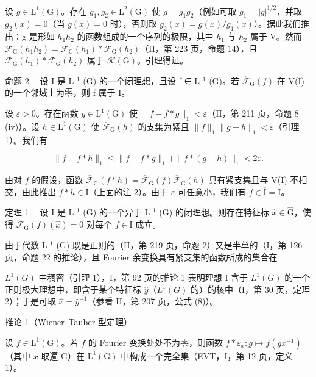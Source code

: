 设 \(g \in \mathrm{L}^{1}(\mathrm{G})\)。存在 \(g_{1}, g_{2} \in \mathrm{L}^{2}(\mathrm{G})\) 使 \(g = g_{1}g_{2}\)（例如可取 \(g_{1} = |g|^{1/2}\)，并取 \(g_{2}(x) = 0\)（当 \(g(x) = 0\) 时），否则取 \(g_{2}(x) = g(x)/g_{1}(x)\)）。据此我们推出：g 是形如 \(h_{1}h_{2}\) 的函数组成的一个序列的极限，其中 \(h_{1}\) 与 \(h_{2}\) 属于 V。然而 \(\mathcal{F}_{\mathrm{G}}(h_{1}h_{2}) = \mathcal{F}_{\mathrm{G}}(h_{1}) * \mathcal{F}_{\mathrm{G}}(h_{2})\)（II，第 223 页，命题 14），且 \(\mathcal{F}_{\mathrm{G}}(h_{1}) * \mathcal{F}_{\mathrm{G}}(h_{2})\) 属于 \(\mathcal{K}(\mathrm{G})\)。引理得证。

命题 2.　设 I 是 L \(^{1}\) (G) 的一个闭理想，且设 f ∈ L \(^{1}\) (G)。若 \(\overline{\mathcal{F}}_{\text{G}}(f)\) 在 V(I) 的一个邻域上为零，则 f 属于 I。

设 \(\varepsilon > 0\)。存在函数 \(g \in \mathrm{L}^1(\mathrm{G})\) 使 \(\|f - f * g\|_1 < \varepsilon\)（II，第 211 页，命题 8 (iv)）。设 \(h \in \mathrm{L}^1(\mathrm{G})\) 使 \(\overline{\mathcal{F}}_{\mathrm{G}}(h)\) 的支集为紧且 \(\|f\|_1 \|g - h\|_1 < \varepsilon\)（引理 1）。我们有

\[
\| f - f * h \| _ {1} \leqslant \| f - f * g \| _ {1} + \| f * (g - h) \| _ {1} <   2 \varepsilon .
\]

由对 \(f\) 的假设，函数 \(\overline{\mathcal{F}}_{\mathrm{G}}(f*h)=\overline{\mathcal{F}}_{\mathrm{G}}(f)\overline{\mathcal{F}}_{\mathrm{G}}(h)\) 具有紧支集且与 V(I) 不相交，由此推出 \(f*h\in\mathrm{I}\)（上面的注 2）。由于 \(\varepsilon\) 可任意小，我们有 \(f\in\overline{\mathrm{I}}=\mathrm{I}\)。

定理 1.　设 I 是 L \(^{1}\) (G) 的一个异于 L \(^{1}\) (G) 的闭理想。则存在特征标 \(\widehat{x} \in \widehat{\mathrm{G}}\)，使得 \(\mathcal{F}_{\mathrm{G}}(f)(\widehat{x}) = 0\) 对每个 \(f \in \mathrm{I}\) 成立。

由于代数 L \(^{1}\) (G) 既是正则的（II，第 219 页，命题 2）又是半单的（I，第 126 页，命题 22 的推论），且 Fourier 余变换具有紧支集的函数所成的集合在

\(L^{1}(G)\) 中稠密（引理 1），I，第 92 页的推论 1 表明理想 I 含于 \(L^{1}(G)\) 的一个正则极大理想中，即含于某个特征标 \(\widehat{y}\)（\(L^{1}(G)\) 的）的核中（I，第 30 页，定理 2）；于是可取 \(\widehat{x} = \widehat{y}^{-1}\)（参看 II，第 207 页，公式 (8)）。

推论 1（Wiener–Tauber 型定理）

设 \(f \in \mathrm{L}^1(\mathrm{G})\)。若 \(f\) 的 Fourier 变换处处不为零，则函数 \(f * \varepsilon_x \colon g \mapsto f(gx^{-1})\)（其中 \(x\) 取遍 \(\mathrm{G}\)）在 \(\mathrm{L}^1(\mathrm{G})\) 中构成一个完全集（EVT，I，第 12 页，定义 1）。

